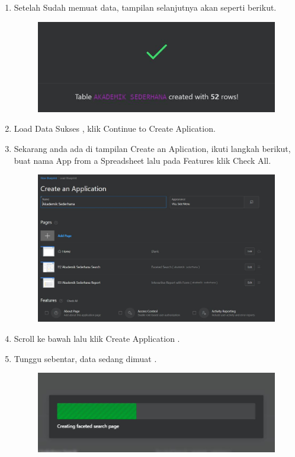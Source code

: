 \begin{enumerate}
\item Setelah Sudah memuat data, tampilan selanjutnya akan seperti berikut.
       \begin{figure}[!htbp]
    \centering
    \includegraphics[scale=0.6]{section/9.JPG}
    \label{gambar 1}
\end{figure}

\item Load Data Sukses , klik Continue to Create Aplication.
\vspace{8cm}

\item Sekarang anda ada di tampilan Create an Aplication, ikuti langkah berikut, buat nama App from a Spreadsheet lalu pada Features klik Check All.
       \begin{figure}[!htbp]
    \centering
    \includegraphics[scale=0.5]{section/10.JPG}
    \label{gambar 1}
\end{figure}


\item Scroll ke bawah lalu klik Create Application .
 

\item Tunggu sebentar, data sedang dimuat .
       \begin{figure}[!htbp]
    \centering
    \includegraphics[scale=0.5]{section/11.JPG}
    \label{gambar 1}
\end{figure}


\end{enumerate}
